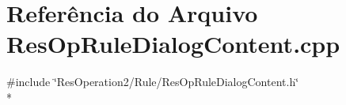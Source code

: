 \section{Referência do Arquivo Res\+Op\+Rule\+Dialog\+Content.\+cpp}
\label{_2_rule_2_res_op_rule_dialog_content_8cpp}
{\ttfamily \#include \char`\"{}Res\+Operation2/\+Rule/\+Res\+Op\+Rule\+Dialog\+Content.\+h\char`\"{}}\\*

